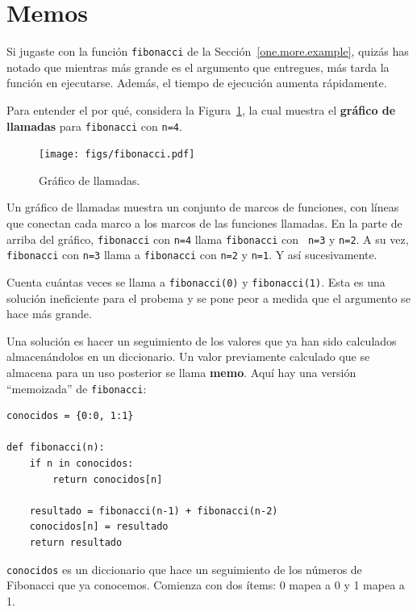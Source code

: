 \documentclass[10pt]{book}
\begin{document}
\section{Memos}
\label{memoize}

Si jugaste con la función {\tt fibonacci} de la
Sección~\ref{one.more.example}, quizás has notado que mientras más grande
es el argumento que entregues, más tarda la función en ejecutarse.
Además, el tiempo de ejecución aumenta rápidamente. 

Para entender el por qué, considera la Figura~\ref{fig.fibonacci}, la cual muestra
el {\bf gráfico de llamadas} para {\tt fibonacci} con {\tt n=4}.

\begin{figure}
\centerline
{\texttt{[image: figs/fibonacci.pdf]}}
\caption{Gráfico de llamadas.}
\label{fig.fibonacci}
\end{figure}

Un gráfico de llamadas muestra un conjunto de marcos de funciones, con líneas que conectan cada
marco a los marcos de las funciones llamadas.  En la parte de arriba del
gráfico, {\tt fibonacci} con {\tt n=4} llama {\tt fibonacci} con {\tt
n=3} y {\tt n=2}.  A su vez, {\tt fibonacci} con {\tt n=3} llama a
{\tt fibonacci} con {\tt n=2} y {\tt n=1}.  Y así sucesivamente.

Cuenta cuántas veces se llama a {\tt fibonacci(0)} y {\tt fibonacci(1)}.
Esta es una solución ineficiente para el probema y se pone peor
a medida que el argumento se hace más grande.

Una solución es hacer un seguimiento de los valores que ya han sido
calculados almacenándolos en un diccionario.   Un valor previamente calculado
que se almacena para un uso posterior se llama {\bf memo}.  Aquí hay una versión
``memoizada'' de {\tt fibonacci}:

\begin{verbatim}
conocidos = {0:0, 1:1}

def fibonacci(n):
    if n in conocidos:
        return conocidos[n]

    resultado = fibonacci(n-1) + fibonacci(n-2)
    conocidos[n] = resultado
    return resultado
\end{verbatim}
%
{\tt conocidos} es un diccionario que hace un seguimiento de los números de Fibonacci
que ya conocemos.  Comienza con
dos ítems: 0 mapea a 0 y 1 mapea a 1.
\end{document}
